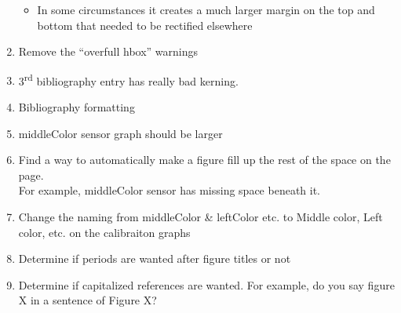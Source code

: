 \documentclass[11pt]{article}
\begin{document}
\begin{enumerate}
        \begin{itemize}
            \item In some circumstances it creates a much larger margin on the top and bottom that needed to be rectified elsewhere
        \end{itemize}
    \item Remove the ``overfull hbox'' warnings
    \item 3\textsuperscript{rd} bibliography entry has really bad kerning.
    \item Bibliography formatting
    \item middleColor sensor graph should be larger
    \item Find a way to automatically make a figure fill up the rest of the space on the page.
        \quad \\ For example, middleColor sensor has missing space beneath it.
    \item Change the naming from middleColor \& leftColor etc. to Middle color, Left color, etc. on the calibraiton graphs
    \item Determine if periods are wanted after figure titles or not
    \item Determine if capitalized references are wanted. For example, do you say figure X in a sentence of Figure X?
\end{enumerate}
\end{document}

